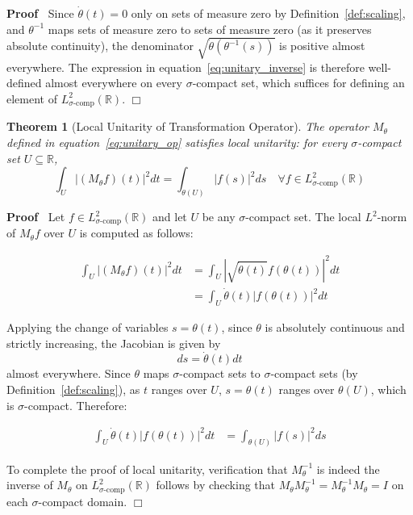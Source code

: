 \documentclass{article}
\newenvironment{proof}{\noindent\textbf{Proof\ }}{\hspace*{\fill}$\Box$\medskip}
\newtheorem{theorem}{Theorem}
\begin{document}
\begin{proof}
  Since $\dot{\theta} (t) = 0$ only on sets of measure zero by
  Definition~\ref{def:scaling}, and $\theta^{- 1}$ maps sets of measure zero
  to sets of measure zero (as it preserves absolute continuity), the
  denominator $\sqrt{\dot{\theta} (\theta^{- 1} (s))}$ is positive almost
  everywhere. The expression in equation~\eqref{eq:unitary_inverse} is
  therefore well-defined almost everywhere on every $\sigma$-compact set,
  which suffices for defining an element of $L^2_{\sigma \text{-comp}}
  (\mathbb{R})$.
\end{proof}

\begin{theorem}
  [Local Unitarity of Transformation Operator]\label{thm:local_unitary} The
  operator $M_{\theta}$ defined in equation~\eqref{eq:unitary_op} satisfies
  local unitarity: for every $\sigma$-compact set $U \subseteq \mathbb{R}$,
  \begin{equation}
    \label{eq:local_L2_preserve} \int_U | (M_{\theta} f) (t) |^2 dt =
    \int_{\theta (U)} |f (s) |^2 ds \quad \forall f \in L^2_{\sigma
    \text{-comp}} (\mathbb{R})
  \end{equation}
\end{theorem}

\begin{proof}
  Let $f \in L^2_{\sigma \text{-comp}} (\mathbb{R})$ and let $U$ be any
  $\sigma$-compact set. The local $L^2$-norm of $M_{\theta} f$ over $U$ is
  computed as follows:
  
  \begin{align}
    \int_U | (M_{\theta} f) (t) |^2 dt & = \int_U \left| \sqrt{\dot{\theta}
    (t)} f (\theta (t)) \right|^2 dt \\
    & = \int_U \dot{\theta} (t) |f (\theta (t)) |^2 dt 
  \end{align}
  
  Applying the change of variables $s = \theta (t)$, since $\theta$ is
  absolutely continuous and strictly increasing, the Jacobian is given by
  \begin{equation}
    ds = \dot{\theta} (t) dt
  \end{equation}
  almost everywhere. Since $\theta$ maps $\sigma$-compact sets to
  $\sigma$-compact sets (by Definition~\ref{def:scaling}), as $t$ ranges over
  $U$, $s = \theta (t)$ ranges over $\theta (U)$, which is $\sigma$-compact.
  Therefore:
  
  \begin{align}
    \int_U \dot{\theta} (t) |f (\theta (t)) |^2 dt & = \int_{\theta (U)} |f
    (s) |^2 ds 
  \end{align}
  
  To complete the proof of local unitarity, verification that $M_{\theta}^{-
  1}$ is indeed the inverse of $M_{\theta}$ on $L^2_{\sigma \text{-comp}}
  (\mathbb{R})$ follows by checking that $M_{\theta} M_{\theta}^{- 1} =
  M_{\theta}^{- 1} M_{\theta} = I$ on each $\sigma$-compact domain.
\end{proof}
\end{document}
